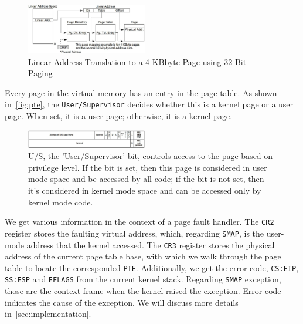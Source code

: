 \begin{figure}[th]
  \includegraphics[width=0.47\textwidth]{figures/pagetable}
  \centering
  \caption{Linear-Address Translation to a 4-KBbyte Page using 32-Bit Paging~\cite{guide2011intel}}
  \label{fig:pagetable}
\end{figure}

Every page in the virtual memory has an entry in the page table. As shown in~\autoref{fig:pte}, the \texttt{User/Supervisor} decides whether this is a kernel page or a user page. When set, it is a user page; otherwise, it is a kernel page.

\begin{figure}[th]
  \includegraphics[width=0.47\textwidth]{figures/pte2}
  \centering
  \caption{U/S, the 'User/Supervisor' bit, controls access to the page based on privilege level. If the bit is set, then this page is considered in user mode space and be accessed by all code; if the bit is not set, then it's considered in kernel mode space and can be accessed only by kernel mode code. }
  \label{fig:pte}
\end{figure}



We get various information in the context of a page fault handler. The \texttt{CR2} register stores the faulting virtual address, which, regarding \texttt{SMAP}, is the user-mode address that the kernel accessed. The \texttt{CR3} register stores the physical address of the current page table base, with which we walk through the page table to locate the corresponded \texttt{PTE}. Additionally, we get the error code, \texttt{CS:EIP}, \texttt{SS:ESP} and \texttt{EFLAGS} from the  current kernel stack. Regarding \texttt{SMAP} exception, those are the context frame when the kernel raised the exception. Error code indicates the cause of the exception. We will discuss more details in~\autoref{sec:implementation}.




